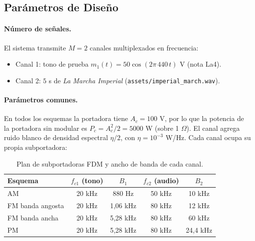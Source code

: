 \documentclass[11pt,a4paper]{article}
\numberwithin{equation}{section}
\begin{document}
\subsection{Parámetros de Diseño}
\paragraph{Número de señales.} El sistema transmite $M=2$ canales multiplexados en frecuencia:
\begin{itemize}
  \item Canal 1: tono de prueba $m_1(t)=50\cos(2\pi\,440\,t)$ V (nota La4).
  \item Canal 2: $5$ s de \textit{La Marcha Imperial} (\texttt{assets/imperial\_march.wav}).
\end{itemize}

\paragraph{Parámetros comunes.} En todos los esquemas la portadora tiene $A_c=100$ V, por lo que la potencia de la portadora sin modular es $P_c=A_c^2/2=5000$ W (sobre 1 $\Omega$). El canal agrega ruido blanco de densidad espectral $\eta/2$, con $\eta=10^{-3}$ W/Hz. Cada canal ocupa su propia subportadora:

\begin{table}[H]
  \centering
  \begin{tabular}{lcccc}
    \toprule
    Esquema & $f_{c1}$ (tono) & $B_1$ & $f_{c2}$ (audio) & $B_2$ \\
    \midrule
    AM            & 20 kHz & 880 Hz   & 50 kHz & 10 kHz \\
    FM banda angosta & 20 kHz & 1,06 kHz & 80 kHz & 12 kHz \\
    FM banda ancha   & 20 kHz & 5,28 kHz & 80 kHz & 60 kHz \\
    PM               & 20 kHz & 5,28 kHz & 80 kHz & 24,4 kHz \\
    \bottomrule
  \end{tabular}
  \caption{Plan de subportadoras FDM y ancho de banda de cada canal.}
  \label{tab:plan}
\end{table}
\end{document}
